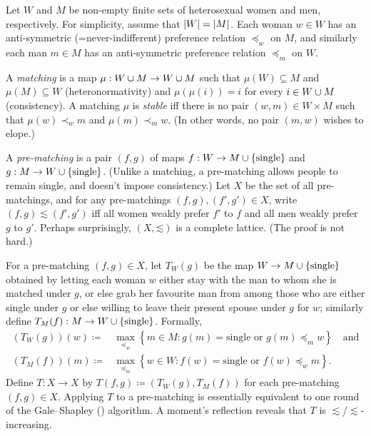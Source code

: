 \begin{example}[matching]
	\label{example:matching}
	Let $W$ and $M$ be non-empty finite sets of heterosexual women and men, respectively. For simplicity, assume that $\abs*{W}=\abs*{M}$. Each woman $w \in W$ has an anti-symmetric (=never-indifferent) preference relation $\preceq_w$ on $M$,
	and similarly each man $m \in M$ has an anti-symmetric preference relation $\preceq_m$ on $W$.

	A \emph{matching} is a map $\mu : W \cup M \to W \cup M$ such that $\mu(W) \subseteq M$ and $\mu(M) \subseteq W$ (heteronormativity) and $\mu(\mu(i))=i$ for every $i \in W \cup M$ (consistency).
	A matching $\mu$ is \emph{stable} iff there is no pair $(w,m) \in W \times M$ such that $\mu(w) \prec_w m$ and $\mu(m) \prec_m w$. (In other words, no pair $(m,w)$ wishes to elope.)

	A \emph{pre-matching} is a pair $(f,g)$ of maps $f : W \to M \cup \{\text{single}\}$ and $g : M \to W \cup \{\text{single}\}$. (Unlike a matching, a pre-matching allows people to remain single, and doesn't impose consistency.) Let $X$ be the set of all pre-matchings, and for any pre-matchings $(f,g),(f',g') \in X$, write $(f,g) \lesssim (f',g')$ iff all women weakly prefer $f'$ to $f$ and all men weakly prefer $g$ to $g'$.
	Perhaps surprisingly, $(X,\mathord{\lesssim})$ is a complete lattice. (The proof is not hard.)

	For a pre-matching $(f,g) \in X$, let $T_W(g)$ be the map $W \to M \cup \{\text{single}\}$ obtained by letting each woman $w$ either stay with the man to whom she is matched under $g$, or else grab her favourite man from among those who are either single under $g$ or else willing to leave their present spouse under $g$ for $w$; similarly define $T_M(f) : M \to W \cup \{\text{single}\}$. Formally,
	\begin{align*}
		(T_W(g))(w) \coloneqq{}& \max_{\preceq_w} \left\{
		m \in M :
		\text{$g(m) = \text{single}$ or $g(m) \preceq_m w$}
		\right\} \quad \text{and}
		\\
		(T_M(f))(m) \coloneqq{}& \max_{\preceq_m} \left\{
		w \in W :
		\text{$f(w) = \text{single}$ or $f(w) \preceq_w m$}
		\right\} .
	\end{align*}
	Define $T : X \to X$ by $T(f,g) \coloneqq (T_W(g),T_M(f))$ for each pre-matching $(f,g) \in X$.
	Applying $T$ to a pre-matching is essentially equivalent to one round of the Gale--Shapley (\citeyear{GaleShapley1962}) algorithm. A moment's reflection reveals that $T$ is $\lesssim$/$\lesssim$-increasing.


\end{example}
